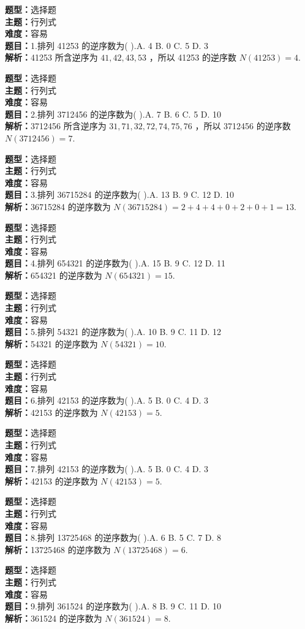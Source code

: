 \documentclass{ctexart}
\newenvironment{question}[5]{%
	\noindent\textbf{题型：}#1\\
	\textbf{主题：}#2\\
	\textbf{难度：}#3\\
	\textbf{题目：}#4\\
	\textbf{解析：}#5\\
	\vspace{1em}
}{}
\begin{document}


	
	\begin{question}
		{选择题}
		{行列式}
		{容易}
		{1.排列 41253 的逆序数为(  ).A. 4 B. 0 C. 5 D. 3}
		{41253 所含逆序为 \(41,42,43,53\) ，所以 41253 的逆序数 \(N(41253)=4\).}
	\end{question}
	
	\begin{question}
		{选择题}
		{行列式}
		{容易}
		{2.排列 3712456 的逆序数为(  ).A. 7 B. 6 C. 5 D. 10}
		{3712456 所含逆序为 \(31,71,32,72,74,75,76\) ，所以 3712456 的逆序数 \(N(3712456)=7\).}
	\end{question}
	
	\begin{question}
		{选择题}
		{行列式}
		{容易}
		{3.排列 36715284 的逆序数为(  ).A. 13 B. 9 C. 12 D. 10}
		{36715284 的逆序数为 \(N(36715284)=2+4+4+0+2+0+1=13\).}
	\end{question}
	
	\begin{question}
		{选择题}
		{行列式}
		{容易}
		{4.排列 654321 的逆序数为(  ).A. 15 B. 9 C. 12 D. 11}
		{654321 的逆序数为 \(N(654321)=15\).}
	\end{question}
	
	\begin{question}
		{选择题}
		{行列式}
		{容易}
		{5.排列 54321 的逆序数为(  ).A. 10 B. 9 C. 11 D. 12}
		{54321 的逆序数为 \(N(54321)=10\).}
	\end{question}
	
	\begin{question}
		{选择题}
		{行列式}
		{容易}
		{6.排列 42153 的逆序数为(  ).A. 5 B. 0 C. 4 D. 3}
		{42153 的逆序数为 \(N(42153)=5\).}
	\end{question}
	
	\begin{question}
		{选择题}
		{行列式}
		{容易}
		{7.排列 42153 的逆序数为(  ).A. 5 B. 0 C. 4 D. 3}
		{42153 的逆序数为 \(N(42153)=5\).}
	\end{question}
	
	\begin{question}
		{选择题}
		{行列式}
		{容易}
		{8.排列 13725468 的逆序数为(  ).A. 6 B. 5 C. 7 D. 8}
		{13725468 的逆序数为 \(N(13725468)=6\).}
	\end{question}
	
	\begin{question}
		{选择题}
		{行列式}
		{容易}
		{9.排列 361524 的逆序数为(  ).A. 8 B. 9 C. 11 D. 10}
		{361524 的逆序数为 \(N(361524)=8\).}
	\end{question}
	
\end{document}
